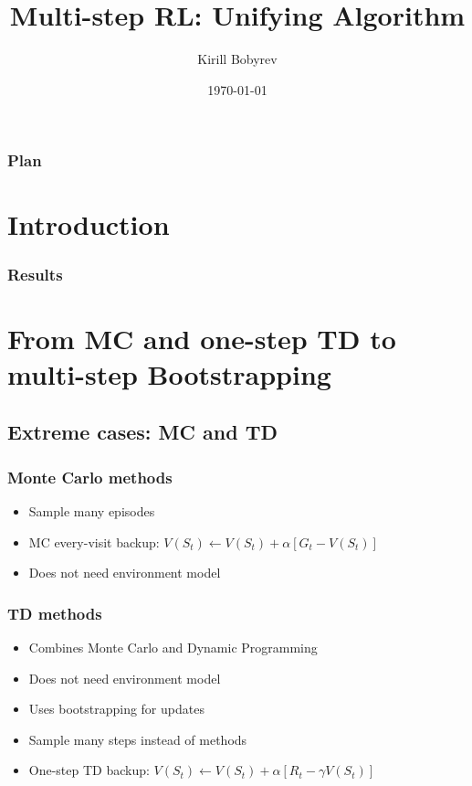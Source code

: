 \documentclass{beamer}
\title{Multi-step RL: Unifying Algorithm}
\author{Kirill Bobyrev}
\date{\today}
\begin{document}
\begin{frame}
  \titlepage
\end{frame}

\begin{frame}
  \frametitle{Plan}
  \tableofcontents
\end{frame}


\section{Introduction}

\begin{frame}
  \frametitle{Results}
\end{frame}

\section{From MC and one-step TD to multi-step Bootstrapping}

\subsection{Extreme cases: MC and TD}

\begin{frame}
  \frametitle{Monte Carlo methods}
  \begin{itemize}
    \item Sample many episodes
    \item MC every-visit backup: $V(S_t) \leftarrow V(S_t) +
      \alpha[G_t - V(S_t)]$
    \item Does not need environment model
  \end{itemize}
\end{frame}

\begin{frame}
  \frametitle{TD methods}
  \begin{itemize}
    \item Combines Monte Carlo and Dynamic Programming
    \item Does not need environment model
    \item Uses bootstrapping for updates
    \item Sample many steps instead of methods
    \item One-step TD backup: $V(S_t) \leftarrow V(S_t) +
      \alpha[R_t - \gamma V(S_t)]$
  \end{itemize}
\end{frame}
\end{document}
